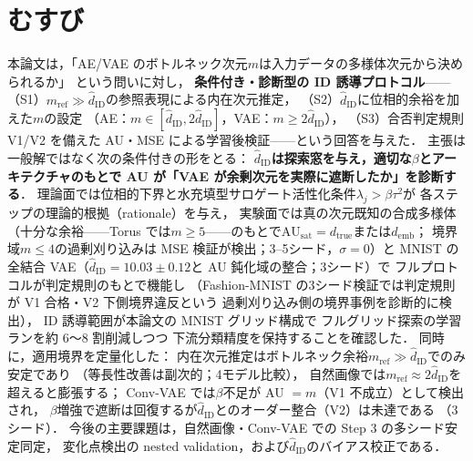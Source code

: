 \documentclass[11pt,a4paper]{jsarticle}
\newcommand{\hatdID}{\hat{d}_{\mathrm{ID}}}
\newcommand{\dtrue}{d_{\mathrm{true}}}
\newcommand{\AUsat}{\mathrm{AU}_{\mathrm{sat}}}
\newcommand{\demb}{d_{\mathrm{emb}}}
\begin{document}
\section{むすび}\label{sec:conclusion}

本論文は，「AE/VAE のボトルネック次元$m$は入力データの多様体次元から決められるか」
という問いに対し，
\textbf{条件付き・診断型の ID 誘導プロトコル}——
（S1）$m_{\mathrm{ref}} \gg \hatdID$の参照表現による内在次元推定，
（S2）$\hatdID$に位相的余裕を加えた$m$の設定
（AE：$m \in [\hatdID, 2\hatdID]$，VAE：$m \geq 2\hatdID$），
（S3）合否判定規則 V1/V2 を備えた AU・MSE による学習後検証——という回答を与えた．
主張は一般解ではなく次の条件付きの形をとる：
\textbf{$\hatdID$は探索窓を与え，適切な$\beta$とアーキテクチャのもとで
AU が「VAE が余剰次元を実際に遮断したか」を診断する}．
理論面では位相的下界と水充填型サロゲート活性化条件$\lambda_j > \beta\tau^2$が
各ステップの理論的根拠（rationale）を与え，
実験面では真の次元既知の合成多様体
（十分な余裕——Torus では$m \geq 5$——のもとで$\AUsat = \dtrue$または$\demb$；
境界域$m \leq 4$の過剰刈り込みは MSE 検証が検出；3--5シード，$\sigma = 0$）と
MNIST の全結合 VAE（$\hatdID = 10.03 \pm 0.12$と AU 鈍化域の整合；3シード）で
フルプロトコルが判定規則のもとで機能し
（Fashion-MNIST の3シード検証では判定規則が V1 合格・V2 下側境界違反という
過剰刈り込み側の境界事例を診断的に検出），
ID 誘導範囲が本論文の MNIST グリッド構成で
フルグリッド探索の学習ランを約 6〜8 割削減しつつ
下流分類精度を保持することを確認した．
同時に，適用境界を定量化した：
内在次元推定はボトルネック余裕$m_{\mathrm{ref}} \gg \hatdID$でのみ安定であり
（等長性改善は副次的；4モデル比較），
自然画像では$m_{\mathrm{ref}} \approx 2\hatdID$を超えると膨張する；
Conv-VAE では$\beta$不足が AU $= m$（V1 不成立）として検出され，
$\beta$増強で遮断は回復するが$\hatdID$とのオーダー整合（V2）は未達である
（3シード）．
今後の主要課題は，自然画像・Conv-VAE での Step 3 の多シード安定同定，
変化点検出の nested validation，および$\hatdID$のバイアス校正である．
\end{document}
